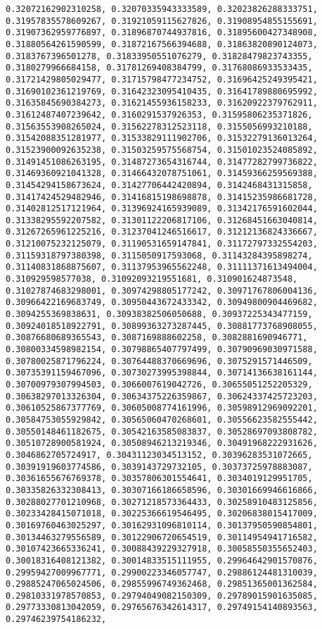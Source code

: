 \documentclass[11pt]{article}
\begin{document}
\begin{Verbatim}[commandchars=\\\{\}]
0.32072162902310258, 0.32070335943333589, 0.32023826288333751, 0.31957835578609267, 0.31921059115627826, 0.31908954855155691, 0.31907362959776897, 0.31896870744937816, 0.31895600427348908, 0.31880564261590599, 0.31872167566394688, 0.31863820890124073, 0.3183767396501278, 0.31833950551076279, 0.31828479823743355, 0.3180279966684158, 0.31781269408384799, 0.31768086933533435, 0.31721429805029477, 0.31715798477234752, 0.31696425249395421, 0.31690102361219769, 0.31642323095410435, 0.31641789880695992, 0.31635845690384273, 0.31621455936158233, 0.31620922379762911, 0.31612487407239642, 0.3160291537926353, 0.31595806235371826, 0.31563553908265024, 0.31562278312523118, 0.3155056993210188, 0.31542088351281977, 0.31533829111902706, 0.31532279136013264, 0.31523900092635238, 0.31503259575568754, 0.31501023524085892, 0.31491451086263195, 0.31487273654316744, 0.31477282799736822, 0.31469360921041328, 0.31466432078751061, 0.31459366259569388, 0.31454294158673624, 0.31427706442420894, 0.3142468431315858, 0.31417424529482946, 0.31416815198698878, 0.31415235986681728, 0.31402812517121964, 0.31396924165939089, 0.31342176591602044, 0.31338295592207582, 0.31301122206817106, 0.31268451663040814, 0.31267265961225216, 0.31237041246516617, 0.31212136824336667, 0.31210075232125079, 0.31190531659147841, 0.31172797332554203, 0.31159318797380398, 0.3115050917593068, 0.31143284395898274, 0.31140831868875607, 0.31137953965562248, 0.31111371613494004, 0.310929598577038, 0.31092093219551681, 0.310901624873548, 0.31027874683298001, 0.30974298805177242, 0.30971767806004136, 0.30966422169683749, 0.30950443672433342, 0.30949800904469682, 0.3094255369838631, 0.30938382506050688, 0.30937225343477159, 0.30924018518922791, 0.30899363273287445, 0.30881773768908055, 0.30876680689365543, 0.3087169888602258, 0.3082881690946771, 0.30800334598982154, 0.30798865407797499, 0.30790969030971588, 0.30780025871796224, 0.30764488370669696, 0.3075291571446509, 0.30735391159467096, 0.30730273995398844, 0.30714136638161144, 0.30700979307994503, 0.3066007619042726, 0.30655051252205329, 0.30638297013326304, 0.30634375226359867, 0.30624337425723203, 0.30610525867377769, 0.30605008774161996, 0.30598912969092201, 0.30584753055929842, 0.30565060470268601, 0.30556623582555442, 0.30550148461182675, 0.30542163585083837, 0.30528697093808782, 0.30510728900581924, 0.30508946213219346, 0.30491968222931626, 0.3046862705724917, 0.30431123034513152, 0.30396283531072665, 0.30391919603774586, 0.3039143729732105, 0.30373725978883087, 0.30361655676769378, 0.30357806301554641, 0.3034019129951705, 0.30335826332308413, 0.30307166186658596, 0.30301669946616866, 0.30288027701210968, 0.30271218573364433, 0.30258910483125856, 0.30233428415071018, 0.30225366619546495, 0.30206838015417009, 0.30169760463025297, 0.30162931096810114, 0.30137950590854801, 0.30134463279556589, 0.30122906720654519, 0.30114954941716582, 0.30107423665336241, 0.30088439229327918, 0.30058550355652403, 0.30018316408121382, 0.30014833515111955, 0.29964642901570876, 0.29959427009967771, 0.29900223346057747, 0.29886124481310039, 0.29885247065024506, 0.29855996749362468, 0.29851365001362584, 0.29810331978570853, 0.29794049082150309, 0.29789015901635085, 0.29773330813042059, 0.29765676342614317, 0.29749154140893563, 0.29746239754186232, 
\end{Verbatim}
\end{document}
